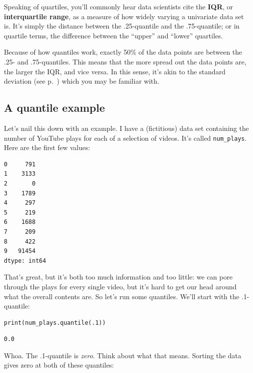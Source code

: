 \label{IQR}

Speaking of quartiles, you'll commonly hear data scientists cite the
\textbf{IQR}, or \textbf{interquartile range}, as a measure of how widely
varying a univariate data set is. It's simply the distance between the
.25-quantile and the .75-quantile; or in quartile terms, the difference between
the ``upper'' and ``lower'' quartiles.

Because of how quantiles work, exactly 50\% of the data points are between the
.25- and .75-quantiles. This means that the more spread out the data points
are, the larger the IQR, and vice versa. In this sense, it's akin to the
standard deviation (see p.~\pageref{standardDeviation}) which you may be
familiar with.

\subsection{A quantile example}

\label{YouTubeData}

Let's nail this down with an example. I have a (fictitious) data set containing
the number of YouTube plays for each of a selection of videos. It's called
\texttt{num\_plays}. Here are the first few values:

\begin{Verbatim}[fontsize=\small,samepage=true,frame=leftline,framesep=5mm,framerule=1mm]
0     791
1    3133
2       0
3    1789
4     297
5     219
6    1688
7     209
8     422
9   91454
dtype: int64
\end{Verbatim}

That's great, but it's both too much information and too little: we can pore
through the plays for every single video, but it's hard to get our head around
what the overall contents are. So let's run some quantiles. We'll start with
the .1-quantile:

\begin{Verbatim}[fontsize=\small,samepage=true,frame=single,framesep=3mm]
print(num_plays.quantile(.1))
\end{Verbatim}
\vspace{-.3in}

\begin{Verbatim}[fontsize=\small,samepage=true,frame=leftline,framesep=5mm,framerule=1mm]
0.0
\end{Verbatim}

\label{pointOneQuantileEpiphany}
Whoa. The .1-quantile is \textit{zero}. Think about what that means.
Sorting the data gives zero at both of these quantiles:

